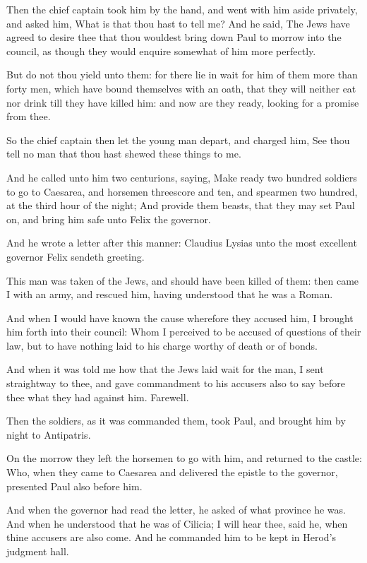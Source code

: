 \verse Then the chief captain took him by the hand, and went with him aside privately, and asked him, What is that thou hast to tell me?  \verse And he said, The Jews have agreed to desire thee that thou wouldest bring down Paul to morrow into the council, as though they would enquire somewhat of him more perfectly.

\verse But do not thou yield unto them: for there lie in wait for him of them more than forty men, which have bound themselves with an oath, that they will neither eat nor drink till they have killed him: and now are they ready, looking for a promise from thee.

\verse So the chief captain then let the young man depart, and charged him, See thou tell no man that thou hast shewed these things to me.

\verse And he called unto him two centurions, saying, Make ready two hundred soldiers to go to Caesarea, and horsemen threescore and ten, and spearmen two hundred, at the third hour of the night; \verse And provide them beasts, that they may set Paul on, and bring him safe unto Felix the governor.

\verse And he wrote a letter after this manner: \verse Claudius Lysias unto the most excellent governor Felix sendeth greeting.

\verse This man was taken of the Jews, and should have been killed of them: then came I with an army, and rescued him, having understood that he was a Roman.

\verse And when I would have known the cause wherefore they accused him, I brought him forth into their council: \verse Whom I perceived to be accused of questions of their law, but to have nothing laid to his charge worthy of death or of bonds.

\verse And when it was told me how that the Jews laid wait for the man, I sent straightway to thee, and gave commandment to his accusers also to say before thee what they had against him. Farewell.

\verse Then the soldiers, as it was commanded them, took Paul, and brought him by night to Antipatris.

\verse On the morrow they left the horsemen to go with him, and returned to the castle: \verse Who, when they came to Caesarea and delivered the epistle to the governor, presented Paul also before him.

\verse And when the governor had read the letter, he asked of what province he was. And when he understood that he was of Cilicia; \verse I will hear thee, said he, when thine accusers are also come. And he commanded him to be kept in Herod's judgment hall.


